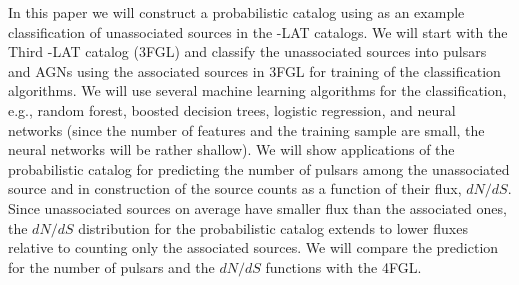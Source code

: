 In this paper we will construct a probabilistic catalog using as an example classification of unassociated sources in the \Fermi-LAT catalogs. 
We will start with the Third \Fermi-LAT catalog (3FGL) and classify the unassociated sources into pulsars and AGNs using the associated sources in 3FGL for training of the classification algorithms.
We will use several machine learning algorithms for the classification, e.g., random forest, boosted decision trees, logistic regression,
and neural networks (since the number of features and the training sample are small, the neural networks will be rather shallow).
We will show applications of the probabilistic catalog for predicting the number of pulsars among the unassociated source and in construction of the source counts as a function of their flux, $dN/dS$.
Since unassociated sources on average have smaller flux than the associated ones, the $dN/dS$ distribution for the probabilistic catalog extends to lower fluxes relative to counting only the associated sources.
We will compare the prediction for the number of pulsars and the $dN/dS$ functions with the 4FGL.



